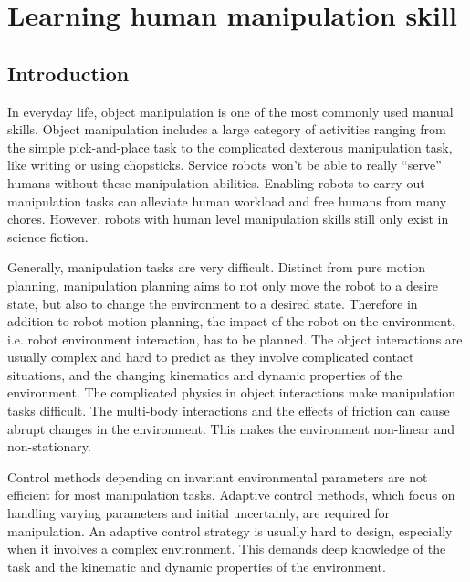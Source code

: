 \chapter{Learning human manipulation skill}
\label{cha4}

\section{Introduction}
\label{cha4:sec1}
In everyday life, object manipulation is one of the most
commonly used manual skills. Object manipulation includes a large category of activities ranging from the simple pick-and-place task to the complicated dexterous manipulation task, like writing or using chopsticks. Service robots won't be able to really ``serve'' humans without these manipulation abilities. Enabling robots to carry out manipulation tasks can alleviate human workload and free humans from many chores. However, robots with human level manipulation skills still only exist in science fiction.

Generally, manipulation tasks are very difficult. Distinct from pure motion planning, manipulation planning aims to not only move the robot to a desire state, but also to change the environment to a desired state. Therefore in addition to robot motion planning, the impact of the robot on the environment, i.e. robot environment interaction, has to be planned. The object interactions are usually complex and hard to predict as they involve complicated contact situations, and the changing kinematics and dynamic properties of the environment. The complicated physics in object interactions make manipulation tasks difficult. The multi-body interactions and the effects of friction can cause abrupt changes in the environment. This makes the environment non-linear and non-stationary.

Control methods depending on invariant
environmental parameters are not efficient for most manipulation tasks. Adaptive control methods, which focus on handling varying parameters and initial uncertainly, are required for manipulation. An adaptive control strategy is usually hard to design, especially when it involves a complex environment. This demands deep knowledge of the task and the kinematic and dynamic properties of the environment.


